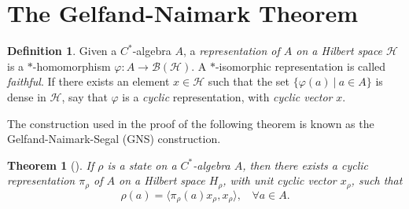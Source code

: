 \documentclass[12pt,a4paper]{report}
\theoremstyle{plain}
\newtheorem{thm}{Theorem}
\theoremstyle{definition}
\newtheorem{defn}{Definition}
\newcommand{\1}{\mathbbm{1}}
\renewcommand{\H}{\mathcal{H}}
\newcommand{\B}{\mathcal{B}}
\newcommand{\BH}{\mathcal{\B(\H)}}
\renewcommand{\phi}{\varphi}
\begin{document}
\section{The Gelfand-Naimark Theorem}

\begin{defn}
	Given a $C^\ast$-algebra $A$, a \emph{representation of $A$ on a Hilbert space $\H$} 
	is a $\ast$-homomorphism $\phi: A \to \BH$. 
	A $\ast$-isomorphic representation is called \emph{faithful}.
	If there exists an element $x\in\H$ such that the set $\{\phi(a) ~|~ a\in A\}$ is dense in $\H$, say 
	that $\phi$ is a \emph{cyclic} representation, with \emph{cyclic vector} $x$.
\end{defn}	
The construction used in the proof of the following theorem is known as the Gelfand-Naimark-Segal (GNS)
construction.
\begin{thm}[{\cite[4.5.2]{kadison83}}]
	If $\rho$ is a state on a $C^\ast$-algebra $A$, then there exists a cyclic representation 
	$\pi_\rho$ of $A$ on a Hilbert space ${H}_\rho$, with unit cyclic vector $x_\rho$, such that 
	\[ 
		\rho(a)= \langle \pi_\rho (a) x_\rho, x_\rho \rangle, ~~~~ \forall a \in A.
	\]
\end{thm}
\end{document}
